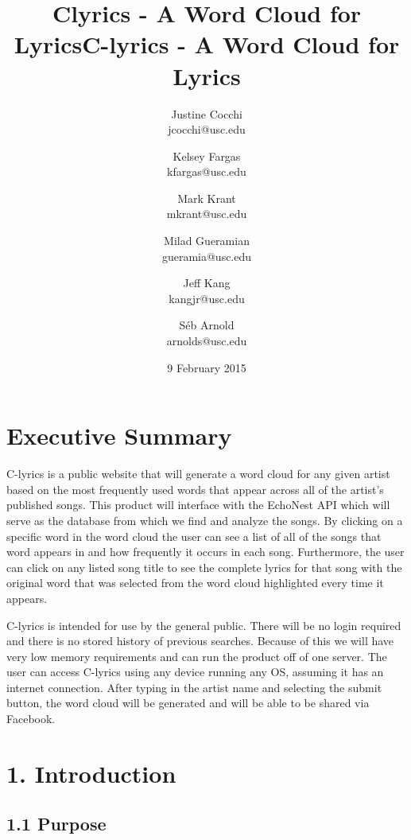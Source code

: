 \documentclass[]{article}
\title{Clyrics - A Word Cloud for Lyrics}
\author{Justine Cocchi\\jcocchi@usc.edu \and Kelsey Fargas\\kfargas@usc.edu \and Mark Krant \\ mkrant@usc.edu\and Milad Gueramian\\gueramia@usc.edu \and Jeff Kang\\kangjr@usc.edu \and Séb Arnold\\arnolds@usc.edu}
\date{9 February 2015}
\title{C-lyrics - A Word Cloud for Lyrics}
\begin{document}
\maketitle

\pagebreak

\tableofcontents
\setcounter{tocdepth}{3}

\pagebreak

\section{Executive Summary}\label{executive-summary}

C-lyrics is a public website that will generate a word cloud for any
given artist based on the most frequently used words that appear across
all of the artist's published songs. This product will interface with
the EchoNest API which will serve as the database from which we find and
analyze the songs. By clicking on a specific word in the word cloud the
user can see a list of all of the songs that word appears in and how
frequently it occurs in each song. Furthermore, the user can click on
any listed song title to see the complete lyrics for that song with the
original word that was selected from the word cloud highlighted every
time it appears.

C-lyrics is intended for use by the general public. There will be no
login required and there is no stored history of previous searches.
Because of this we will have very low memory requirements and can run
the product off of one server. The user can access C-lyrics using any
device running any OS, assuming it has an internet connection. After
typing in the artist name and selecting the submit button, the word
cloud will be generated and will be able to be shared via Facebook.

\pagebreak

\section{1. Introduction}\label{introduction}

\subsection{1.1 Purpose}\label{purpose}
\end{document}
